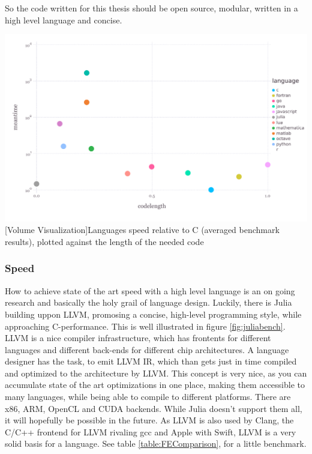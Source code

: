 So the code written for this thesis should be open source, modular, written in a high level language and concise.


\vspace{1em}
\begin{minipage}{\linewidth}
    \centering
    \includegraphics[width=0.9\linewidth]{graphics/julia_bench.pdf}
    [Volume Visualization]{Languages speed relative to C (averaged benchmark results), plotted against the length of the needed code}
    \label{fig:juliabench}
\end{minipage}

\subsubsection{Speed}

How to achieve state of the art speed with a high level language is an on going research and basically the holy grail of language design.
Luckily, there is Julia building uppon \ac{LLVM}, promosing a concise, high-level programming style, while approaching C-performance. 
This is well illustrated in figure \ref{fig:juliabench}.
\ac{LLVM} is a nice compiler infrastructure, which has frontents for different languages and different back-ends for different chip architectures. 
A language designer has the task, to emit \ac{LLVM} \ac{IR}, which than gets just in time compiled and optimized to the architecture by \ac{LLVM}.
This concept is very nice, as you can accumulate state of the art optimizations in one place, making them accessible to many languages, while being able to compile to different platforms. There are x86, ARM, OpenCL and CUDA backends. While Julia doesn't support them all, it will hopefully be possible in the future. 
As \ac{LLVM} is also used by Clang, the C/C++ frontend for \ac{LLVM} rivaling gcc and Apple with Swift, \ac{LLVM} is a very solid basis for a language.
See table \ref{table:FEComparison}, for a little benchmark.

